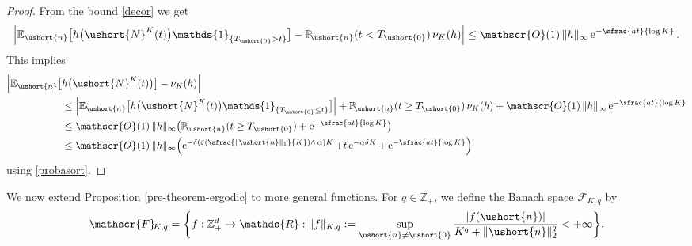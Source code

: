 \documentclass[10pt]{amsart}
\newcommand{\Psfrac}[2]{(\sfrac{#1}{#2})}
\newcommand{\scaleto}[2]{#1}
\let\mathcal\mathscr
\numberwithin{equation}{section}
\theoremstyle{plain}
\theoremstyle{definition}
\newcommand{\proba}{{\mathbb{P}}}
\newcommand{\E}{{\mathbb{E}}}
\newcommand{\zentiers}{{\mathbb{Z}}}
\newcommand{\domaine}{\zentiers_{+}^{d}}
\newcommand{\Oun}{\mathcal{O}(1)}
\newcommand{\sK}{K}
\newcommand{\un}{\mathds{1}}
\newcommand{\vecn}{\ushort{n}}
\newcommand{\veczer}{\ushort{0}}
\newcommand{\leproc}{\ushort{N}^{K}}
\newcommand{\nuk}{\nu_{K}}\let\snuk\nuk
\newcommand{\e}{\operatorname{e}}
\newcommand{\normdeux}[1]{\|#1\|_{2}}\let\snormdeux\normdeux
\begin{document}
\begin{proof}
From the bound \eqref{decor} we get
\[
\left|\E_{\vecn}\bigl[h\bigl(\leproc(t)\bigr)\un_{\{T_{\veczer}>t\}}\bigr]
-\proba\!_{\vecn}(t<T_{\veczer})\,\nuk(h)\right|
\le\Oun\, \|h\|_{\scaleto{\infty}{3pt}}\e^{-\sfrac{a t}{\log K}}.
\]
This implies
\begin{align*}
\Bigl|\E_{\vecn}\bigl[&h\bigl(\leproc(t)\bigr)\bigr]-\nuk(h)\Bigr| \\
& \le
\left|\E_{\vecn} \bigl[h\bigl(\leproc(t)\bigr)\un_{\{T_{\veczer}\le t\}} \bigr]\right|
+\proba\!_{\vecn}(t\ge T_{\veczer})\,\nuk(h)+\Oun\, \|h\|_{\scaleto{\infty}{3pt}}\e^{-\sfrac{a t}{\log K}}
\\
& \le \Oun\, \|h\|_{\scaleto{\infty}{3pt}}\bigl(\proba\!_{\vecn}(t\ge T_{\veczer})+\e^{-\sfrac{a t}{\log K}}\bigr)
\\
& \le \Oun\, \|h\|_{\scaleto{\infty}{3pt}}\Bigl(\e^{-\delta\left(\zeta\Psfrac{\|\vecn\|_{1}}{K}\wedge\,\alpha\right)K}
+t \e^{-\alpha\delta K}+\e^{-\sfrac{a t}{\log K}}\Bigr)
\end{align*}
using \eqref{probasort}.
\end{proof}

We now extend Proposition \ref{pre-theorem-ergodic} to more general functions.
For $q\in\zentiers_+$, we define the Banach space
$\mathscr{F}\!_{\sK,q}$ by
\begin{equation}\label{observables}
\mathscr{F}\!_{\sK,q}
=\biggl\{f: \domaine \rightarrow \mathds{R} :
\|f\|_{\sK,q}:= \sup_{ \vecn\neq \veczer} \frac{|f(\vecn)|}{K^q+\normdeux{\vecn}^{\scaleto{q}{3.6pt}}}<+\infty \biggr\}.
\end{equation}
\end{document}

